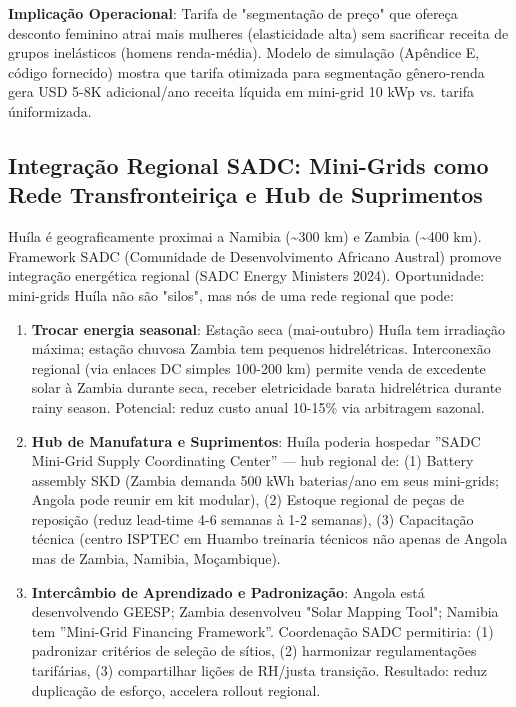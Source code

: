 \documentclass[12pt, a4paper]{article}
\begin{document}
\textbf{Implicação Operacional}: Tarifa de "segmentação de preço" que ofereça desconto feminino atrai mais mulheres (elasticidade alta) sem sacrificar receita de grupos inelásticos (homens renda-média). Modelo de simulação (Apêndice E, código fornecido) mostra que tarifa otimizada para segmentação gênero-renda gera USD 5-8K adicional/ano receita líquida em mini-grid 10 kWp vs. tarifa úniformizada.

\subsection{Integração Regional SADC: Mini-Grids como Rede Transfronteiriça e Hub de Suprimentos}

Huíla é geograficamente proximai a Namibia (\textasciitilde{}300 km) e Zambia (\textasciitilde{}400 km). Framework SADC (Comunidade de Desenvolvimento Africano Austral) promove integração energética regional (SADC Energy Ministers 2024). Oportunidade: mini-grids Huíla não são "silos", mas nós de uma rede regional que pode:
\begin{enumerate}
\item \textbf{Trocar energia seasonal}: Estação seca (mai-outubro) Huíla tem irradiação máxima; estação chuvosa Zambia tem pequenos hidrelétricas. Interconexão regional (via enlaces DC simples 100-200 km) permite venda de excedente solar à Zambia durante seca, receber eletricidade barata hidrelétrica durante rainy season. Potencial: reduz custo anual 10-15\% via arbitragem sazonal.

\item \textbf{Hub de Manufatura e Suprimentos}: Huíla poderia hospedar ''SADC Mini-Grid Supply Coordinating Center'' — hub regional de: (1) Battery assembly SKD (Zambia demanda 500 kWh baterias/ano em seus mini-grids; Angola pode reunir em kit modular), (2) Estoque regional de peças de reposição (reduz lead-time 4-6 semanas à 1-2 semanas), (3) Capacitação técnica (centro ISPTEC em Huambo treinaria técnicos não apenas de Angola mas de Zambia, Namibia, Moçambique).

\item \textbf{Intercâmbio de Aprendizado e Padronização}: Angola está desenvolvendo GEESP; Zambia desenvolveu "Solar Mapping Tool"; Namibia tem ''Mini-Grid Financing Framework''. Coordenação SADC permitiria: (1) padronizar critérios de seleção de sítios, (2) harmonizar regulamentações tarifárias, (3) compartilhar lições de RH/justa transição. Resultado: reduz duplicação de esforço, accelera rollout regional.
\end{enumerate}
\end{document}
